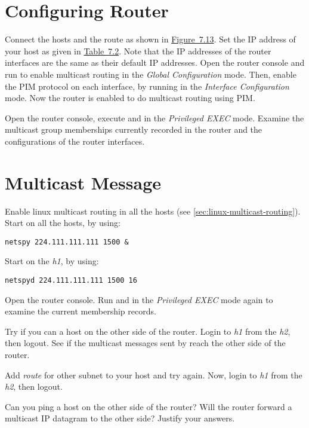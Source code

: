\documentclass{../UTNetLab}
\begin{document}
\section{Configuring Router}
\label{sec:config-router}
Connect the hosts and the route as shown in \hyperref[fig:7.13]{Figure~7.13}.
Set the IP address of your host as given in \hyperref[tab:7.2]{Table~7.2}.
Note that the IP addresses of the router interfaces are the same as their default IP addresses.
Open the router console and run  to enable multicast routing in the \textit{Global Configuration} mode.
Then, enable the PIM protocol on each interface, by running  in the \textit{Interface Configuration} mode.
Now the router is enabled to do multicast routing using PIM.

Open the router console, execute  and  in the \textit{Privileged EXEC} mode.
Examine the multicast group memberships currently recorded in the router and the configurations of the router interfaces.

\section{Multicast Message}
Enable linux multicast routing in all the hosts (see \autoref{sec:linux-multicast-routing}).\\
Start  on all the hosts, by using:
\begin{lstlisting}
netspy 224.111.111.111 1500 &
    \end{lstlisting}
Start  on the \textit{h1}, by using:
\begin{lstlisting}
netspyd 224.111.111.111 1500 16
    \end{lstlisting}

Open the router console.
Run  and  in the \textit{Privileged EXEC} mode again to examine the current membership records.

Try if you can  a host on the other side of the router.
Login to \textit{h1} from the \textit{h2}, then logout.
See if the multicast messages sent by  reach the other side of the router.

Add \textit{route} for other subnet to your host and try  again.
Now, login to \textit{h1} from the \textit{h2}, then logout.

\begin{report}
    \item Can you ping a host on the other side of the router?
    Will the router forward a multicast IP datagram to the other side?
    Justify your answers.
\end{report}
\end{document}
